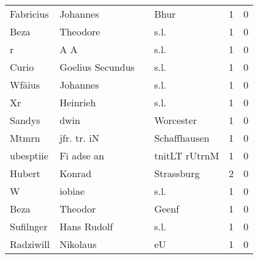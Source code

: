 \begin{center}
\begin{tiny}
\begin{longtabu}{llllrr}
                Fabricius &                           Johannes &             &                                        Bhur &          1 &         0 \\
                     Beza &                           Theodore &             &                                        s.l. &          1 &         0 \\
                        r &                                A A &             &                                        s.l. &          1 &         0 \\
                    Curio &                   Goelius Secundus &             &                                        s.l. &          1 &         0 \\
                   Wfäius &                           Johannes &             &                                        s.l. &          1 &         0 \\
                       Xr &                           Heinrieh &             &                                        s.l. &          1 &         0 \\
                   Sandys &                               dwin &             &                                   Worcester &          1 &         0 \\
                    Mtmrn &                        jfr. tr. iN &             &                                Schaffhausen &          1 &         0 \\
                ubesptiie &                         Fi adse an &             &                               tnitLT rUtrnM &          1 &         0 \\
                   Hubert &                             Konrad &             &                                  Strassburg &          2 &         0 \\
                        W &                             iobiae &             &                                        s.l. &          1 &         0 \\
                     Beza &                            Theodor &             &                                       Geenf &          1 &         0 \\
                Sufilnger &                        Hans Rudolf &             &                                        s.l. &          1 &         0 \\
                Radziwill &                           Nikolaus &             &                                          eU &          1 &         0 \\

\end{longtabu}
\end{tiny}
\end{center}
